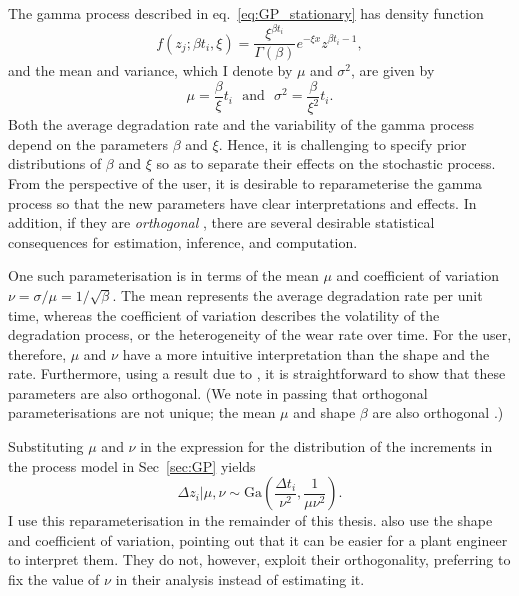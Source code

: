 The gamma process described in eq.~\eqref{eq:GP_stationary} has density function
\begin{equation}
  \label{eq:GamDist}
  f(z_j; \beta t_i, \xi) = \frac{\xi^{\beta t_i}}{\Gamma(\beta)} e^{-\xi x} z^{\beta t_i - 1}, 
\end{equation}
and the mean and variance, which I denote by $\mu$ and $\sigma^2$, are given by
\begin{equation}
  \label{eq:GamProp}
  \mu = \frac{\beta}{\xi}t_i \,\,\,\,\mbox{and}\,\,\,\,\sigma^2 = \frac{\beta}{\xi^2}t_i.
\end{equation}
Both the average degradation rate and the variability of the gamma process depend on the parameters $\beta$ and $\xi$. Hence, it is challenging to specify prior distributions of $\beta$ and $\xi$ so as to separate their effects on the stochastic process. From the perspective of the user, it is desirable to reparameterise the gamma process so that the new parameters have clear interpretations and effects. In addition, if they are \emph{orthogonal} \citep{cox1987}, there are several desirable statistical consequences for estimation, inference, and computation.

One such parameterisation is in terms of the mean $\mu$ and coefficient of variation $\nu = \sigma/\mu = 1/\sqrt{\beta}$. The mean represents the average degradation rate per unit time, whereas the coefficient of variation describes the volatility of the degradation process, or the heterogeneity of the wear rate over time. For the user, therefore, $\mu$ and $\nu$ have a more intuitive interpretation than the shape and the rate. Furthermore, using a result due to \citet{huzurbazar1956}, it is straightforward to show that these parameters are also orthogonal. (We note in passing that orthogonal parameterisations are not unique; the mean $\mu$ and shape $\beta$ are also orthogonal \citep{huzurbazar1956}.)

Substituting $\mu$ and $\nu$ in the expression for the distribution of the increments in the process model in Sec~\ref{sec:GP} yields
\begin{equation} 
  \label{eq:GP_stationary_reparam}
  \Delta z_i|\mu, \nu \sim \mbox{Ga} \left( \frac{\Delta t_i}{\nu^2}, \frac{1}{\mu \nu^2} \right).
\end{equation}
I use this reparameterisation in the remainder of this thesis. \citet{kallen2005} also use the shape and coefficient of variation, pointing out that it can be easier for a plant engineer to interpret them. They do not, however, exploit their orthogonality, preferring to fix the value of $\nu$ in their analysis instead of estimating it.

